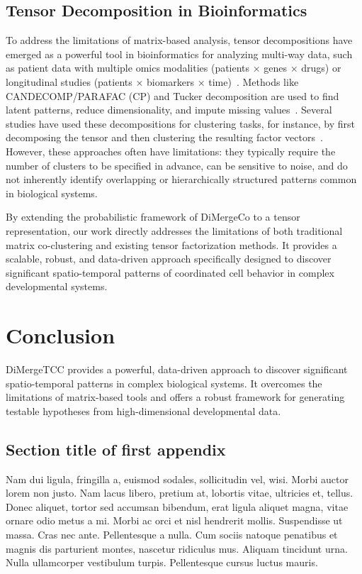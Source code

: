 \documentclass[numsec,webpdf,modern,large]{oup-authoring-template}%
\theoremstyle{thmstyleone}%
\theoremstyle{thmstyletwo}%
\theoremstyle{thmstylethree}%
\begin{document}
\subsection{Tensor Decomposition in Bioinformatics}
To address the limitations of matrix-based analysis, tensor decompositions have emerged as a powerful tool in bioinformatics for analyzing multi-way data, such as patient data with multiple omics modalities (patients × genes × drugs) or longitudinal studies (patients × biomarkers × time)~\citep{kolda2009TensorDecompositionsApplications}. Methods like CANDECOMP/PARAFAC (CP) and Tucker decomposition are used to find latent patterns, reduce dimensionality, and impute missing values~\citep{yu2025OptimizationMethodsTensor}. Several studies have used these decompositions for clustering tasks, for instance, by first decomposing the tensor and then clustering the resulting factor vectors~\citep{cheng2019TensorBasedLowDimensionalRepresentation}. However, these approaches often have limitations: they typically require the number of clusters to be specified in advance, can be sensitive to noise, and do not inherently identify overlapping or hierarchically structured patterns common in biological systems.

By extending the probabilistic framework of DiMergeCo to a tensor representation, our work directly addresses the limitations of both traditional matrix co-clustering and existing tensor factorization methods. It provides a scalable, robust, and data-driven approach specifically designed to discover significant spatio-temporal patterns of coordinated cell behavior in complex developmental systems.

\section{Conclusion}
DiMergeTCC provides a powerful, data-driven approach to discover significant spatio-temporal patterns in complex biological systems. It overcomes the limitations of matrix-based tools and offers a robust framework for generating testable hypotheses from high-dimensional developmental data.


\begin{appendices}

\section{Section title of first appendix}\label{sec11}

Nam dui ligula, fringilla a, euismod sodales, sollicitudin vel, wisi. Morbi auctor lorem non justo. Nam lacus libero,
pretium at, lobortis vitae, ultricies et, tellus. Donec aliquet, tortor sed accumsan bibendum, erat ligula aliquet magna,
vitae ornare odio metus a mi. Morbi ac orci et nisl hendrerit mollis. Suspendisse ut massa. Cras nec ante. Pellentesque
a nulla. Cum sociis natoque penatibus et magnis dis parturient montes, nascetur ridiculus mus. Aliquam tincidunt
urna. Nulla ullamcorper vestibulum turpis. Pellentesque cursus luctus mauris.

\end{appendices}
\end{document}
